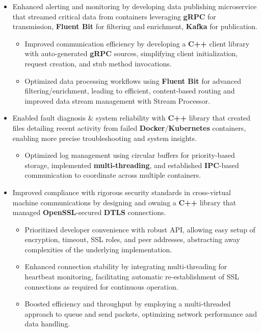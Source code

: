 \documentclass[a4paper]{article}
\begin{document}
\begin{itemize}
	\item Enhanced alerting and monitoring by developing data publishing microservice that streamed critical data from containers leveraging \textbf{gRPC} for transmission, \textbf{Fluent Bit} for filtering and enrichment, \textbf{Kafka} for publication.
        \begin{itemize}
	        \item Improved communication efficiency by developing a \textbf{C++} client library with auto-generated \textbf{gRPC} sources, simplifying client initialization, request creation, and stub method invocations.
	        \item Optimized data processing workflows using \textbf{Fluent Bit} for advanced filtering/enrichment, leading to efficient, content-based routing and improved data stream management with Stream Processor.
        \end{itemize}
	\item Enabled fault diagnosis \& system reliability with \textbf{C++} library that created files detailing recent activity from failed \textbf{Docker}/\textbf{Kubernetes} containers, enabling more precise troubleshooting and system insights.
        \begin{itemize}
	        \item Optimized log management using circular buffers for priority-based storage, implemented \textbf{multi-threading}, and established \textbf{IPC}-based communication to coordinate across multiple containers.
        \end{itemize}
	\item Improved compliance with rigorous security standards in cross-virtual machine communications by designing and owning a \textbf{C++} library that managed \textbf{OpenSSL}-secured \textbf{DTLS} connections.
        \begin{itemize}
	        \item Prioritized developer convenience with robust API, allowing easy setup of encryption, timeout, SSL roles, and peer addresses, abstracting away complexities of the underlying implementation.
	        \item Enhanced connection stability by integrating multi-threading for heartbeat monitoring, facilitating automatic re-establishment of SSL connections as required for continuous operation.
	        \item Boosted efficiency and throughput by employing a multi-threaded approach to queue and send packets, optimizing network performance and data handling.

\end{itemize}
\end{itemize}
\end{document}
